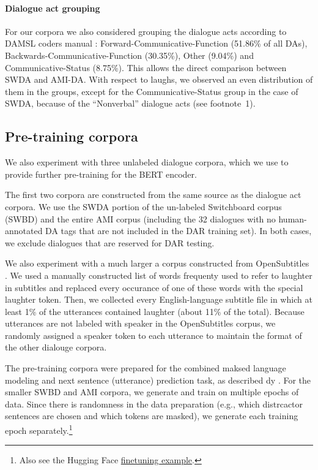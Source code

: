 \documentclass[11pt,a4paper]{article}
\begin{document}
\paragraph{Dialogue act grouping}
For our corpora we also considered grouping the dialogue acts according to DAMSL coders manual \citep{jurafskySwitchboardSWBDDAMSLShallowDiscourseFunction1997a}: Forward-Communicative-Function (51.86\% of all DAs), Backwards-Communicative-Function (30.35\%), Other (9.04\%) and Communicative-Status (8.75\%).
This allows the direct comparison between SWDA and AMI-DA.
With respect to laughs, we observed an even distribution of them in the groups, except for the Communicative-Status group in the case of SWDA, because of the ``Nonverbal'' dialogue acts (see footnote~1).

\subsection{Pre-training corpora}

We also experiment with three unlabeled dialogue corpora, which we use to provide further pre-training for the BERT encoder.

The first two corpora are constructed from the same source as the dialogue act corpora.
We use the SWDA portion of the un-labeled Switchboard corpus (SWBD) and the entire AMI corpus (including the 32 dialogues with no human-annotated DA tags that are not included in the DAR training set).
In both cases, we exclude dialogues that are reserved for DAR testing.

We also experiment with a much larger a corpus constructed from OpenSubtitles \citep{Lison2016}.
We used a manually constructed list of words frequenty used to refer to laughter in subtitles and replaced every occurance of one of these words with the special laughter token. 
Then, we collected every English-language subtitle file in which at least 1\% of the utterances contained laughter (about 11\% of the total).
Because utterances are not labeled with speaker in the OpenSubtitles corpus, we randomly assigned a speaker token to each utterance to maintain the format of the other dialouge corpora.

The pre-training corpora were prepared for the combined maksed language modeling and next sentence (utterance) prediction task, as described dy \citet{devlinBERTPretrainingDeep2018}.
For the smaller SWBD and AMI corpora, we generate and train on multiple epochs of data. Since there is randomness in the data preparation (e.g., which distrcactor sentences are chosen and which tokens are masked), we generate each training epoch separately.\footnote{Also see the Hugging Face \href{https://github.com/huggingface/transformers/tree/1.1.0/examples/lm_finetuning}{finetuning example}.}
\end{document}
